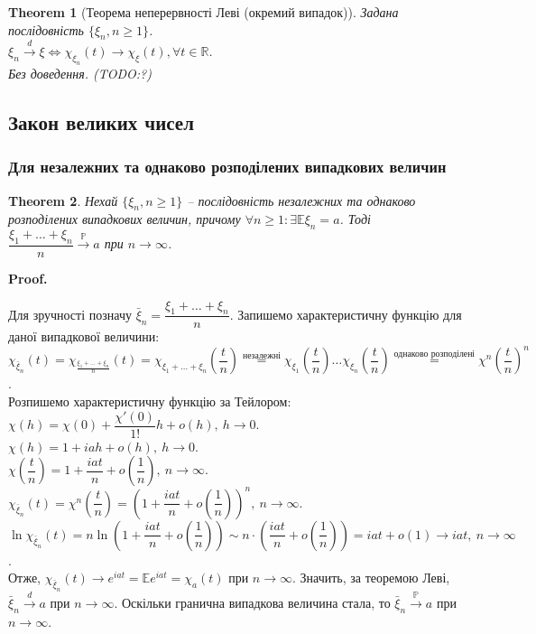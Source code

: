 \documentclass[a4paper, 10pt]{article}
\makeatletter
\theoremstyle{theoremdd}
\newtheorem{theorem}{Theorem}[subsection]
\renewenvironment{proof}[1][Proof.\\]{\par
\pushQED{\hfill \qed}%
\normalfont \topsep6\p@\@plus6\p@\relax
\trivlist
\item\relax
{\bfseries
#1\@addpunct{.}}\hspace\labelsep\ignorespaces
}{%
\popQED\endtrivlist\@endpefalse
}
\newcommand{\toprobability}{\overset{\mathbb{P}}{\to}}
\newcommand{\todistribution}{\overset{d}{\to}}
\makeatother
\begin{document}
\begin{theorem}[Теорема неперервності Леві (окремий випадок)]
Задана послідовність $\{\xi_n, n \geq 1\}$.\\
$\xi_n \todistribution \xi \iff \chi_{\xi_n}(t) \to \chi_\xi(t), \forall t \in \mathbb{R}$.\\
\textit{Без доведення.} (TODO:?)
\end{theorem}

\subsection{Закон великих чисел}
\subsubsection{Для незалежних та однаково розподілених випадкових величин}
\begin{theorem}
Нехай $\{\xi_n, n \geq 1 \}$ -- послідовність незалежних та однаково розподілених випадкових величин, причому $\forall n \geq 1: \exists \mathbb{E}\xi_n = a$. Тоді $\dfrac{\xi_1+\dots+\xi_n}{n} \toprobability a$ при $n \to \infty$.
\end{theorem}

\begin{proof}
Для зручності позначу $\bar{\xi}_n = \dfrac{\xi_1 + \dots + \xi_n}{n}$. Запишемо характеристичну функцію для даної випадкової величини:\\
$\chi_{\bar{\xi}_n}(t) = \chi_{\frac{\xi_1+\dots+\xi_n}{n}}(t) = \chi_{\xi_1+\dots+\xi_n}\left(\dfrac{t}{n}\right) \overset{\text{незалежні}}{=} \chi_{\xi_1} \left(\dfrac{t}{n}\right) \dots \chi_{\xi_n}\left(\dfrac{t}{n}\right) \overset{\text{однаково розподілені}}{=}  \chi^n\left(\dfrac{t}{n}\right)^n$.\\
Розпишемо характеристичну функцію за Тейлором:\\
$\chi(h) = \chi(0) + \dfrac{\chi'(0)}{1!}h + o(h),\ h \to 0$.\\
$\chi(h) = 1 + iah + o(h),\ h \to 0$.\\
$\chi\left(\dfrac{t}{n}\right) = 1 + \dfrac{iat}{n} + o\left(\dfrac{1}{n}\right),\ n \to \infty$.\\
$\chi_{\bar{\xi}_n}(t) = \chi^n\left(\dfrac{t}{n}\right) = \left(1 + \dfrac{iat}{n} + o\left(\dfrac{1}{n}\right)\right)^n,\ n \to \infty$.\\
$\ln \chi_{\bar{\xi}_n}(t) = n \ln \left(1 + \dfrac{iat}{n} + o\left(\dfrac{1}{n}\right)\right) \sim n \cdot \left( \dfrac{iat}{n} + o\left(\dfrac{1}{n}\right)\right) = iat + o(1) \to iat,\ n \to \infty$.\\
Отже, $\chi_{\bar{\xi}_n}(t) \to e^{iat} = \mathbb{E} e^{iat} = \chi_a(t)$ при $n \to \infty$. Значить, за теоремою Леві, $\bar{\xi}_n \todistribution a$ при $n \to \infty$. Оскільки гранична випадкова величина стала, то $\bar{\xi}_n \toprobability a$ при $n \to \infty$.
\end{proof}
\end{document}
